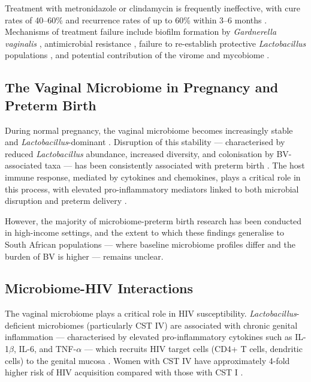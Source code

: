\documentclass[12pt,a4paper]{report}
\begin{document}
Treatment with metronidazole or clindamycin is frequently ineffective, with cure rates of 40--60\% and recurrence rates of up to 60\% within 3--6 months \cite{bradshaw2016current}. Mechanisms of treatment failure include biofilm formation by \textit{Gardnerella vaginalis} \cite{castro2021, sobel2025}, antimicrobial resistance \cite{li2020, rigo2020}, failure to re-establish protective \textit{Lactobacillus} populations \cite{bradshaw2015making}, and potential contribution of the virome and mycobiome \cite{arroyo2022}.

\subsection{The Vaginal Microbiome in Pregnancy and Preterm Birth}

During normal pregnancy, the vaginal microbiome becomes increasingly stable and \textit{Lactobacillus}-dominant \cite{florova2021, caller2021}. Disruption of this stability --- characterised by reduced \textit{Lactobacillus} abundance, increased diversity, and colonisation by BV-associated taxa --- has been consistently associated with preterm birth \cite{callahan2017, david2022, shannon2020}. The host immune response, mediated by cytokines and chemokines, plays a critical role in this process, with elevated pro-inflammatory mediators linked to both microbial disruption and preterm delivery \cite{romero2014, weckle2019}.

However, the majority of microbiome-preterm birth research has been conducted in high-income settings, and the extent to which these findings generalise to South African populations --- where baseline microbiome profiles differ and the burden of BV is higher --- remains unclear.

\subsection{Microbiome-HIV Interactions}

The vaginal microbiome plays a critical role in HIV susceptibility. \textit{Lactobacillus}-deficient microbiomes (particularly CST IV) are associated with chronic genital inflammation --- characterised by elevated pro-inflammatory cytokines such as IL-1$\beta$, IL-6, and TNF-$\alpha$ --- which recruits HIV target cells (CD4+ T cells, dendritic cells) to the genital mucosa \cite{gosmann2017lactobacillus, lennard2018microbial, masson2015}. Women with CST IV have approximately 4-fold higher risk of HIV acquisition compared with those with CST I \cite{gosmann2017lactobacillus}.
\end{document}

